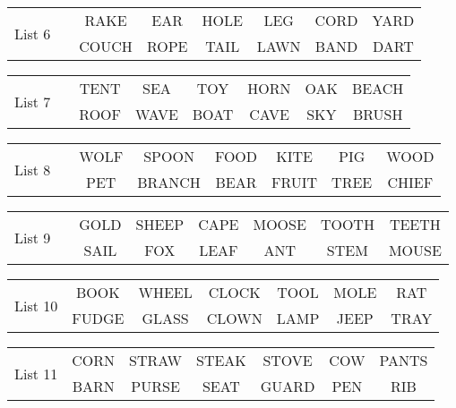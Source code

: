 \documentclass{article}
\begin{document}
\vspace{.1in}
\hspace{.5in}\begin{tabular}{r||c c c c c c }
\multirow{2}{*}{List 6~~} & RAKE & EAR & HOLE & LEG & CORD & YARD\\
\cline{2-7}			& COUCH & ROPE & TAIL & LAWN & BAND & DART\\
\end{tabular}

\vspace{.1in}
\hspace{.5in}\begin{tabular}{r||c c c c c c }
\multirow{2}{*}{List 7~~} & TENT & SEA & TOY & HORN & OAK & BEACH\\
\cline{2-7}			& ROOF & WAVE & BOAT & CAVE & SKY & BRUSH\\
\end{tabular}

\vspace{.1in}
\hspace{.5in}\begin{tabular}{r||c c c c c c }
\multirow{2}{*}{List 8~~} & WOLF & SPOON & FOOD & KITE & PIG & WOOD\\
\cline{2-7}			& PET & BRANCH & BEAR & FRUIT & TREE & CHIEF\\
\end{tabular}

\vspace{.1in}
\hspace{.5in}\begin{tabular}{r||c c c c c c }
\multirow{2}{*}{List 9~~} & GOLD & SHEEP & CAPE & MOOSE & TOOTH & TEETH\\
\cline{2-7}			& SAIL & FOX & LEAF & ANT & STEM & MOUSE\\
\end{tabular}

\vspace{.1in}
\hspace{.5in}\begin{tabular}{r||c c c c c c }
\multirow{2}{*}{List 10} & BOOK & WHEEL & CLOCK & TOOL & MOLE & RAT\\
\cline{2-7}			& FUDGE & GLASS & CLOWN & LAMP & JEEP & TRAY\\
\end{tabular}

\vspace{.1in}
\hspace{.5in}\begin{tabular}{r||c c c c c c }
\multirow{2}{*}{List 11} & CORN & STRAW & STEAK & STOVE & COW & PANTS\\
\cline{2-7}			& BARN & PURSE & SEAT & GUARD & PEN & RIB\\
\end{tabular}
\end{document}
